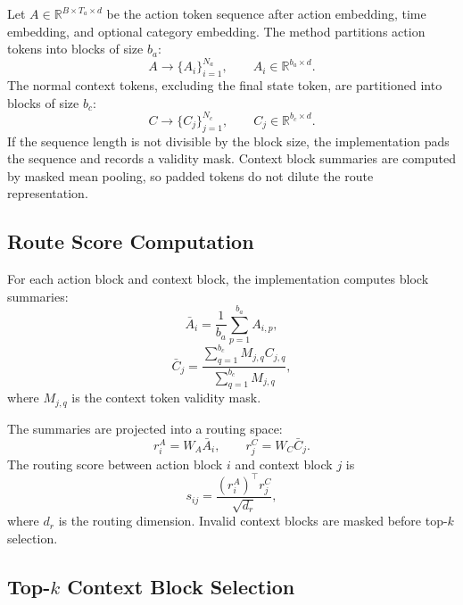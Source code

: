 \documentclass[11pt]{article}
\begin{document}
Let $A \in \mathbb{R}^{B \times T_a \times d}$ be the action token sequence after action embedding, time embedding, and optional category embedding. The method partitions action tokens into blocks of size $b_a$:
\begin{equation}
    A \rightarrow \{A_i\}_{i=1}^{N_a},
    \qquad
    A_i \in \mathbb{R}^{b_a \times d}.
\end{equation}
The normal context tokens, excluding the final state token, are partitioned into blocks of size $b_c$:
\begin{equation}
    C \rightarrow \{C_j\}_{j=1}^{N_c},
    \qquad
    C_j \in \mathbb{R}^{b_c \times d}.
\end{equation}
If the sequence length is not divisible by the block size, the implementation pads the sequence and records a validity mask. Context block summaries are computed by masked mean pooling, so padded tokens do not dilute the route representation.

\subsection{Route Score Computation}

For each action block and context block, the implementation computes block summaries:
\begin{equation}
    \bar{A}_i = \frac{1}{b_a}\sum_{p=1}^{b_a} A_{i,p},
\end{equation}
\begin{equation}
    \bar{C}_j =
    \frac{\sum_{q=1}^{b_c} M_{j,q} C_{j,q}}
    {\sum_{q=1}^{b_c} M_{j,q}},
\end{equation}
where $M_{j,q}$ is the context token validity mask.

The summaries are projected into a routing space:
\begin{equation}
    r^A_i = W_A \bar{A}_i,
    \qquad
    r^C_j = W_C \bar{C}_j.
\end{equation}
The routing score between action block $i$ and context block $j$ is
\begin{equation}
    s_{ij}
    =
    \frac{(r^A_i)^\top r^C_j}{\sqrt{d_r}},
\end{equation}
where $d_r$ is the routing dimension. Invalid context blocks are masked before top-$k$ selection.

\subsection{Top-$k$ Context Block Selection}
\end{document}
